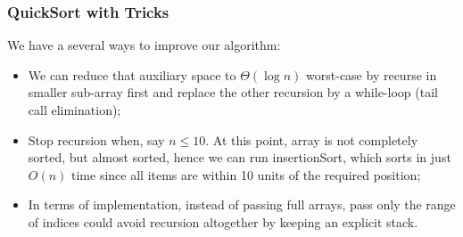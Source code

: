 \documentclass{article}
\begin{document}
\begin{center}
\end{center}

\subsubsection{QuickSort with Tricks}

We have a several ways to improve our algorithm: 
\begin{itemize}
    \item We can reduce that auxiliary space to $\Theta(\log{n})$ worst-case by recurse in smaller sub-array first and replace the other recursion by a while-loop (tail call elimination); 
    \item Stop recursion when, say $n \leq 10$. At this point, array is not completely sorted, but almost sorted, hence we can run insertionSort, which sorts in just $O(n)$ time since all items are within 10 units of the required position; 
    \item In terms of implementation, instead of passing full arrays, pass only the range of indices could avoid recursion altogether by keeping an explicit stack. 
\end{itemize}
\end{document}

